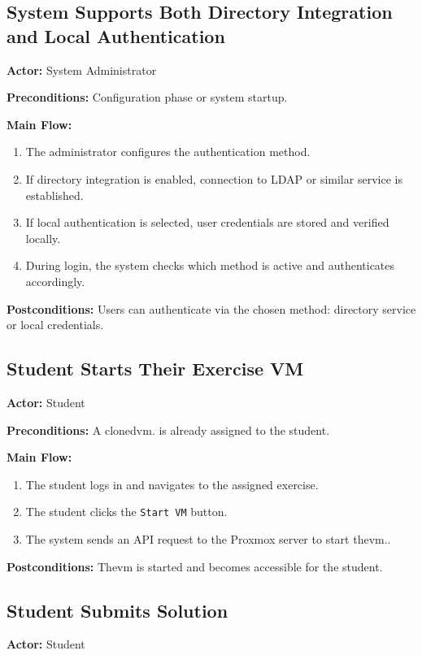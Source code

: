     \subsection{System Supports Both Directory Integration and Local Authentication}
        \textbf{Actor:} System Administrator

        \textbf{Preconditions:} Configuration phase or system startup.

        \textbf{Main Flow:}
        \begin{enumerate}
            \item The administrator configures the authentication method.
            \item If directory integration is enabled, connection to LDAP or similar service is established.
            \item If local authentication is selected, user credentials are stored and verified locally.
            \item During login, the system checks which method is active and authenticates accordingly.
        \end{enumerate}

        \textbf{Postconditions:} Users can authenticate via the chosen method: directory service or local credentials.


    \subsection{Student Starts Their Exercise VM}
        \textbf{Actor:} Student

        \textbf{Preconditions:} A cloned\ac{vm}. is already assigned to the student.

        \textbf{Main Flow:}
        \begin{enumerate}
            \item The student logs in and navigates to the assigned exercise.
            \item The student clicks the \texttt{Start VM} button.
            \item The system sends an API request to the Proxmox server to start the\ac{vm}..
        \end{enumerate}

        \textbf{Postconditions:} The\ac{vm} is started and becomes accessible for the student.

    \subsection{Student Submits Solution}
        \textbf{Actor:} Student

